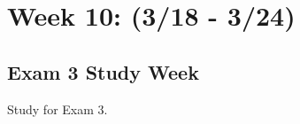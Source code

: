 \clearpage

\renewcommand{\ChapTitle}{Week 10: (3/18 - 3/24)}
\renewcommand{\SectionTitle}{Exam 3 Study Week}

\chapter{\ChapTitle}

\section{\SectionTitle}

Study for Exam 3.
